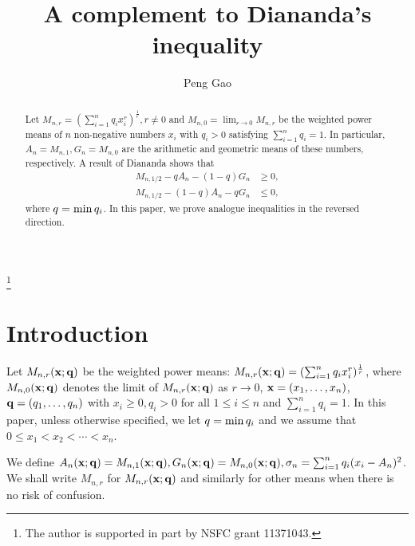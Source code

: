 \documentclass[11pt]{amsart}
\numberwithin{equation}{section}
\theoremstyle{definition}
\theoremstyle{remark}
\begin{document}
\title{A complement to Diananda's inequality}
\author{Peng Gao}
\address{Department of Mathematics, School of Mathematics and System Sciences, Beijing University of Aeronautics and Astronautics, P. R. China}
\thanks{The author is supported in part by NSFC grant 11371043.}

\begin{abstract}  Let $M_{n,r}=(\sum_{i=1}^{n}q_ix_i^r)^{\frac {1}{r}}, r \neq 0$ and $M_{n,0}=\lim_{r \rightarrow 0}M_{n,r}$ be the weighted power means of $n$ non-negative numbers $x_i$ with $q_i > 0$ satisfying $\sum^n_{i=1}q_i=1$. In particular,
   $A_n=M_{n,1}, G_n=M_{n,0}$ are the arithmetic and geometric means of these numbers, respectively.  A result of Diananda shows that
\begin{align*}
    M_{n,1/2}-qA_n-(1-q)G_n & \geq 0, \\
    M_{n,1/2}-(1-q)A_n-qG_n & \leq 0,
\end{align*}
  where $q=\min q\sb i$.
In this paper, we prove analogue inequalities in the reversed direction.
\end{abstract}

\maketitle
\section{Introduction}

   Let $M_{n,r}({\bf x}; {\bf q})$ be the weighted power means:
   $M_{n,r}({\bf x}; {\bf q})=(\sum_{i=1}^{n}q_ix_i^r)^{\frac {1}{r}}$, where
   $M_{n,0}({\bf x}; {\bf q})$ denotes the limit of $M_{n,r}({\bf x}; {\bf q})$ as
   $r\rightarrow 0$, ${\bf x}=(x_1, \ldots,
   x_n)$, ${\bf q}=(q_1, \ldots,
   q_n)$ with $x_i \geq 0, q_i>0$ for all $1 \leq i \leq n$ and $\sum_{i=1}^nq_i=1$. In this paper, unless otherwise specified, we let $q=\min q\sb i$ and
   we assume that
   $0\leq x_1 < x_2 < \cdots < x_n$.

   We define $A_n({\bf x};{\bf q})=M_{n,1}({\bf x};{\bf q}), G_n({\bf x};{\bf q})=M_{n,0}({\bf x};{\bf q}), \sigma_n=\sum_{i=1}^{n}q_i(x_i-A_n)^2$. We shall write $M_{n,r}$ for $M_{n,r}({\bf x};{\bf q})$
   and similarly for other means when there is no risk of
   confusion.
\end{document}
